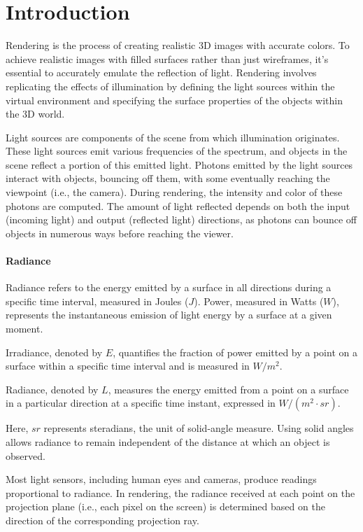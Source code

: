 \section{Introduction}

Rendering is the process of creating realistic 3D images with accurate colors.
To achieve realistic images with filled surfaces rather than just wireframes, it's essential to accurately emulate the reflection of light.
Rendering involves replicating the effects of illumination by defining the light sources within the virtual environment and specifying the surface properties of the objects within the 3D world.

Light sources are components of the scene from which illumination originates.
These light sources emit various frequencies of the spectrum, and objects in the scene reflect a portion of this emitted light.
Photons emitted by the light sources interact with objects, bouncing off them, with some eventually reaching the viewpoint (i.e., the camera).
During rendering, the intensity and color of these photons are computed.
The amount of light reflected depends on both the input (incoming light) and output (reflected light) directions, as photons can bounce off objects in numerous ways before reaching the viewer.

\paragraph*{Radiance}
Radiance refers to the energy emitted by a surface in all directions during a specific time interval, measured in Joules ($J$).
Power, measured in Watts ($W$), represents the instantaneous emission of light energy by a surface at a given moment.
\begin{definition}
    Irradiance, denoted by $E$, quantifies the fraction of power emitted by a point on a surface within a specific time interval and is measured in $W/m^2$. 
\end{definition}
\begin{definition}
    Radiance, denoted by $L$, measures the energy emitted from a point on a surface in a particular direction at a specific time instant, expressed in $W/(m^2\cdot sr)$. 
\end{definition}
Here, $sr$ represents steradians, the unit of solid-angle measure. 
Using solid angles allows radiance to remain independent of the distance at which an object is observed.

Most light sensors, including human eyes and cameras, produce readings proportional to radiance. 
In rendering, the radiance received at each point on the projection plane (i.e., each pixel on the screen) is determined based on the direction of the corresponding projection ray.